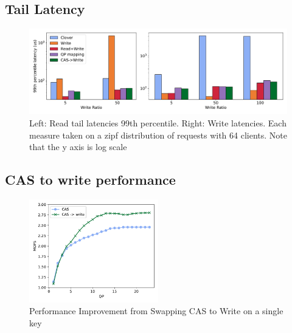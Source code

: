 
\subsection{Tail Latency}

\begin{figure}
    \includegraphics[width=1.0\textwidth]{fig/99th_latency.pdf}

    \caption{Left: Read tail latencies 99th percentile. Right: Write latencies.
    Each measure taken on a zipf distribution of requests with 64 clients. Note that the y axis is log scale}

    \label{fig:tail_latency}
\end{figure}

\subsection{CAS to write performance}

\begin{figure}
    \includegraphics[width=0.5\textwidth]{fig/cas_vs_swap.pdf}
    \caption{Performance Improvement from Swapping CAS to Write on a single key}
    \label{fig:cas_vs_swap}
\end{figure}

